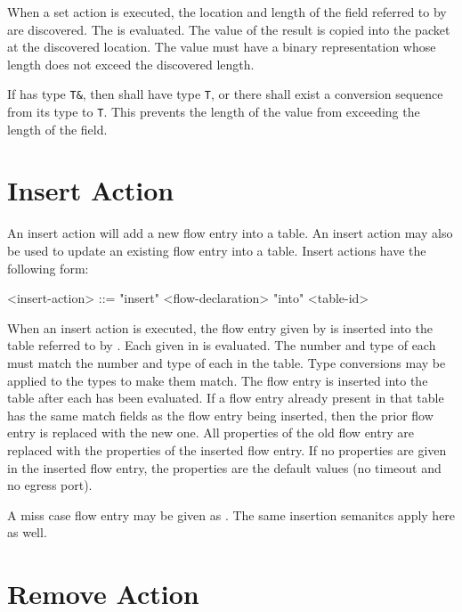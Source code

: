 When a set action is executed, the location and length of the field referred to by  are discovered. The  is evaluated. The value of the result is copied into the packet at the discovered location. The value must have a binary representation whose length does not exceed the discovered length. 

If  has type \texttt{T\&}, then  shall have type \texttt{T}, or there shall exist a conversion sequence from its type to \texttt{T}. This prevents the length of the value from exceeding the length of the field.

\section{Insert Action} \label{guide:insert_flow}

An insert action will add a new flow entry into a table. An insert action may also be used to update an existing flow entry into a table. Insert actions have the following form:

\begin{minip}
\begin{grammar}
<insert-action> ::= "insert" <flow-declaration> "into" <table-id>
\end{grammar}
\end{minip}

When an insert action is executed, the flow entry given by  is inserted into the table referred to by . Each  given in  is evaluated. The number and type of each  must match the number and type of each  in the table. Type conversions may be applied to the types to make them match. The flow entry is inserted into the table after each  has been evaluated. If a flow entry already present in that table has the same match fields as the flow entry being inserted, then the prior flow entry is replaced with the new one. All properties of the old flow entry are replaced with the properties of the inserted flow entry. If no properties are given in the inserted flow entry, the properties are the default values (no timeout and no egress port).

A miss case flow entry may be given as . The same insertion semanitcs apply here as well.

\section{Remove Action} \label{guide:remove_flow}

